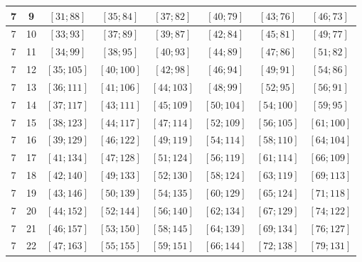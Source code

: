 \documentclass[a4paper,12pt]{article}
\begin{document}
\begin{center}
{\begin{longtable}[H]{|c|c|c|c|c|c|c|c|}
7 &  9 &  $\left[ 31; 88\right]$ &  $\left[ 35; 84\right]$ &  $\left[ 37; 82\right]$ &  $\left[ 40; 79\right]$ &  $\left[ 43; 76\right]$ &  $\left[ 46; 73\right]$ \tabularnewline \hline
7 &  10 &  $\left[ 33; 93\right]$ &  $\left[ 37; 89\right]$ &  $\left[ 39; 87\right]$ &  $\left[ 42; 84\right]$ &  $\left[ 45; 81\right]$ &  $\left[ 49; 77\right]$ \tabularnewline \hline
7 &  11 &  $\left[ 34; 99\right]$ &  $\left[ 38; 95\right]$ &  $\left[ 40; 93\right]$ &  $\left[ 44; 89\right]$ &  $\left[ 47; 86\right]$ &  $\left[ 51; 82\right]$ \tabularnewline \hline
7 &  12 &  $\left[ 35; 105\right]$ &  $\left[ 40; 100\right]$ &  $\left[ 42; 98\right]$ &  $\left[ 46; 94\right]$ &  $\left[ 49; 91\right]$ &  $\left[ 54; 86\right]$ \tabularnewline \hline
7 &  13 &  $\left[ 36; 111\right]$ &  $\left[ 41; 106\right]$ &  $\left[ 44; 103\right]$ &  $\left[ 48; 99\right]$ &  $\left[ 52; 95\right]$ &  $\left[ 56; 91\right]$ \tabularnewline \hline
7 &  14 &  $\left[ 37; 117\right]$ &  $\left[ 43; 111\right]$ &  $\left[ 45; 109\right]$ &  $\left[ 50; 104\right]$ &  $\left[ 54; 100\right]$ &  $\left[ 59; 95\right]$ \tabularnewline \hline
7 &  15 &  $\left[ 38; 123\right]$ &  $\left[ 44; 117\right]$ &  $\left[ 47; 114\right]$ &  $\left[ 52; 109\right]$ &  $\left[ 56; 105\right]$ &  $\left[ 61; 100\right]$ \tabularnewline \hline
7 &  16 &  $\left[ 39; 129\right]$ &  $\left[ 46; 122\right]$ &  $\left[ 49; 119\right]$ &  $\left[ 54; 114\right]$ &  $\left[ 58; 110\right]$ &  $\left[ 64; 104\right]$ \tabularnewline \hline
7 &  17 &  $\left[ 41; 134\right]$ &  $\left[ 47; 128\right]$ &  $\left[ 51; 124\right]$ &  $\left[ 56; 119\right]$ &  $\left[ 61; 114\right]$ &  $\left[ 66; 109\right]$ \tabularnewline \hline
7 &  18 &  $\left[ 42; 140\right]$ &  $\left[ 49; 133\right]$ &  $\left[ 52; 130\right]$ &  $\left[ 58; 124\right]$ &  $\left[ 63; 119\right]$ &  $\left[ 69; 113\right]$ \tabularnewline \hline
7 &  19 &  $\left[ 43; 146\right]$ &  $\left[ 50; 139\right]$ &  $\left[ 54; 135\right]$ &  $\left[ 60; 129\right]$ &  $\left[ 65; 124\right]$ &  $\left[ 71; 118\right]$ \tabularnewline \hline
7 &  20 &  $\left[ 44; 152\right]$ &  $\left[ 52; 144\right]$ &  $\left[ 56; 140\right]$ &  $\left[ 62; 134\right]$ &  $\left[ 67; 129\right]$ &  $\left[ 74; 122\right]$ \tabularnewline \hline
7 &  21 &  $\left[ 46; 157\right]$ &  $\left[ 53; 150\right]$ &  $\left[ 58; 145\right]$ &  $\left[ 64; 139\right]$ &  $\left[ 69; 134\right]$ &  $\left[ 76; 127\right]$ \tabularnewline \hline
7 &  22 &  $\left[ 47; 163\right]$ &  $\left[ 55; 155\right]$ &  $\left[ 59; 151\right]$ &  $\left[ 66; 144\right]$ &  $\left[ 72; 138\right]$ &  $\left[ 79; 131\right]$ \tabularnewline \hline

\end{longtable}}
\end{center}
\end{document}
